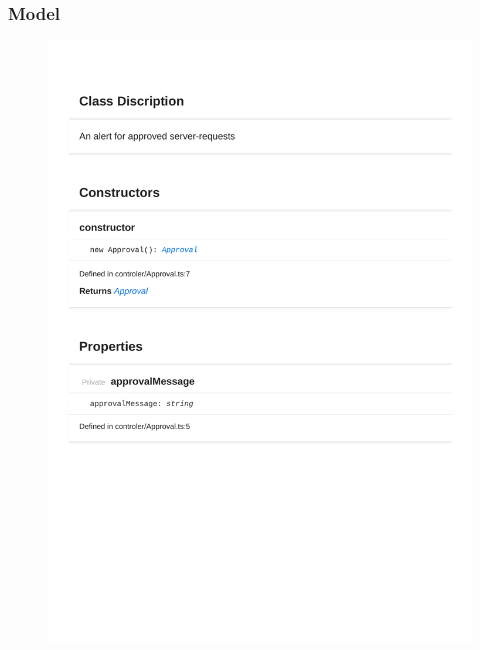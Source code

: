\subsubsection{Model}
\begin{figure}[H]
\centerline{\includegraphics[width=\textwidth]{FrontendDocsAsPDF/Model/Approval.pdf}}
\end{figure}

